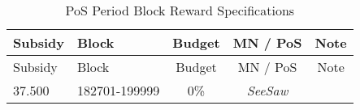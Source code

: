 \documentclass[11pt,a4paperpaper,]{report}
\begin{document}
\begin{longtable}[]{@{}llccc@{}}
\caption{PoS Period Block Reward Specifications
\label{ref_c_table}}\tabularnewline
\toprule
\begin{minipage}[b]{0.12\columnwidth}\raggedright\strut
Subsidy\strut
\end{minipage} & \begin{minipage}[b]{0.19\columnwidth}\raggedright\strut
Block\strut
\end{minipage} & \begin{minipage}[b]{0.14\columnwidth}\centering\strut
Budget\strut
\end{minipage} & \begin{minipage}[b]{0.24\columnwidth}\centering\strut
MN / PoS\strut
\end{minipage} & \begin{minipage}[b]{0.12\columnwidth}\centering\strut
Note\strut
\end{minipage}\tabularnewline
\midrule
\endfirsthead
\toprule
\begin{minipage}[b]{0.12\columnwidth}\raggedright\strut
Subsidy\strut
\end{minipage} & \begin{minipage}[b]{0.19\columnwidth}\raggedright\strut
Block\strut
\end{minipage} & \begin{minipage}[b]{0.14\columnwidth}\centering\strut
Budget\strut
\end{minipage} & \begin{minipage}[b]{0.24\columnwidth}\centering\strut
MN / PoS\strut
\end{minipage} & \begin{minipage}[b]{0.12\columnwidth}\centering\strut
Note\strut
\end{minipage}\tabularnewline
\midrule
\endhead
\begin{minipage}[t]{0.12\columnwidth}\raggedright\strut
37.500\strut
\end{minipage} & \begin{minipage}[t]{0.19\columnwidth}\raggedright\strut
182701-199999\strut
\end{minipage} & \begin{minipage}[t]{0.14\columnwidth}\centering\strut
0\%\strut
\end{minipage} & \begin{minipage}[t]{0.24\columnwidth}\centering\strut
\textit{SeeSaw}\strut
\end{minipage} & \begin{minipage}[t]{0.12\columnwidth}\centering\strut

\end{minipage}
\end{longtable}
\end{document}
